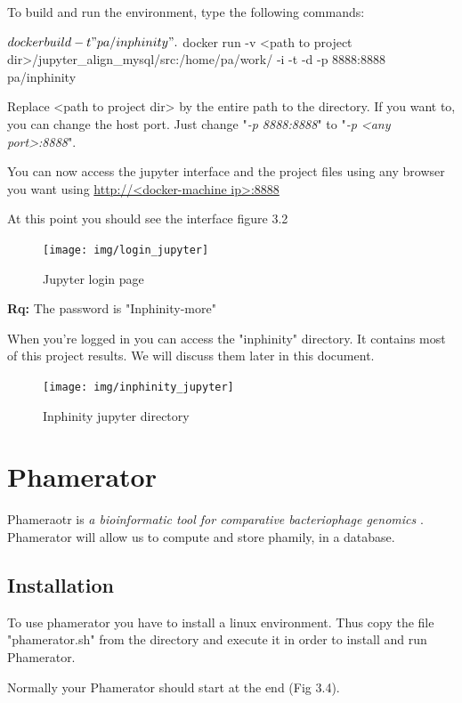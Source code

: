 \documentclass[a4paper,11pt]{report}
\begin{document}
To build and run the environment, type the following commands:
\begin{javacode}
$ docker build -t "pa/inphinity" .
$ docker run -v <path to project dir>/jupyter_align_mysql/src:/home/pa/work/ -i -t -d -p 8888:8888 pa/inphinity
\end{javacode}

Replace <path to project dir> by the entire path to the directory. If you want to, you can change the host port. Just change "\textit{-p 8888:8888}" to "\textit{-p <any port>:8888}".

You can now access the jupyter interface and the project files using any browser you want using \url{http://<docker-machine ip>:8888}

At this point you should see the interface figure 3.2

\begin{figure}[H] 
	\begin{center}
		\texttt{[image: img/login\_jupyter]}
		\caption{Jupyter login page}
	\end{center}
\end{figure}

\textbf{Rq:} The password is "Inphinity-more"

When you're logged in you can access the "inphinity" directory. It contains most of this project results. We will discuss them later in this document.

\begin{figure}[H] 
	\begin{center}
		\texttt{[image: img/inphinity\_jupyter]}
		\caption{Inphinity jupyter directory}
	\end{center}
\end{figure}
\newpage
\section{Phamerator}
Phameraotr is \textit{a bioinformatic tool for comparative bacteriophage genomics} \cite{ref4}. Phamerator will allow us to compute and store phamily, in a database. 

\subsection{Installation}
To use phamerator you have to install a linux environment. Thus copy the file "phamerator.sh" from the directory and execute it in order to install and run Phamerator.

Normally your Phamerator should start at the end (Fig 3.4).
\end{document}
